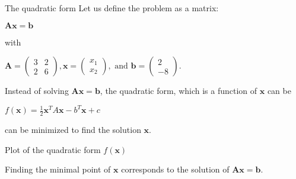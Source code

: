 \documentclass[\classoption]{beamer}
\begin{document}
\begin{frame}{The quadratic form}
Let us define the problem as a matrix:\\
\begin{center}
$\mathbf{A} \mathbf{x}=\mathbf{b}$
\end{center}
with 
\begin{center}
$\mathbf{A} = \begin{pmatrix}
 3 & 2 \\ 2 & 6 
\end{pmatrix}, \mathbf{x}=\begin{pmatrix}
x_1 \\ x_2  
\end{pmatrix}, \text{ and }  \mathbf{b}=\begin{pmatrix}
2 \\ -8  
\end{pmatrix}\text{.}$
\end{center}
\vspace{0.25cm}


Instead of solving $\mathbf{A}\mathbf{x}=\mathbf{b}$, the quadratic form, which is a function of $\mathbf{x}$ can be 

\begin{center}
$ f(\mathbf{x}) = \frac{1}{2} \mathbf{x}^T A \mathbf{x} - b^T \mathbf{x} + c$
\end{center}
can be minimized to find the solution $\mathbf{x}$.
\vspace{0.25cm}

\end{frame}

\begin{frame}{Plot of the quadratic form $f(\mathbf{x})$}

\begin{center}
\end{center}
\vspace{-0.5cm}
Finding the minimal point of $\mathbf{x}$ corresponds to the solution of $\mathbf{A} \mathbf{x}=\mathbf{b}$.
\end{frame}
\end{document}
